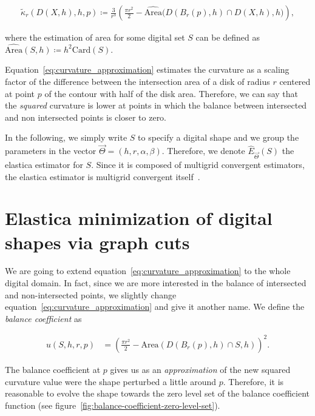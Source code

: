 \documentclass[smallextended]{svjour3}
\begin{document}
\begin{align}
  \tilde{\kappa}_r(D(X,h),h,p) \coloneqq \frac{3}{r^3}\left( \frac{\pi r^2}{2} - \widehat{\text{Area}}\big( D(B_r(p),h) \cap D(X,h),h\big) \right),
  \label{eq:curvature_approximation}
\end{align}

where the estimation of area for some digital set $S$ can be defined as $\widehat{\text{Area}}(S,h) \coloneqq h^2\text{Card}\left( S \right).$ 

Equation~\ref{eq:curvature_approximation} estimates the curvature as a scaling factor of the difference between the intersection area of a disk of radius $r$ centered at point $p$ of the contour with half of the disk area. Therefore, we can say that the \emph{squared} curvature is lower at points in which the balance between intersected and non intersected points is closer to zero.

In the following, we simply write $S$ to specify a digital shape and we group the parameters in the vector $\vec{\Theta}=(h,r,\alpha,\beta)$. Therefore, we denote $\hat{E}_{\vec{\Theta}}(S)$ the elastica estimator for $S$. Since it is composed of multigrid convergent estimators, the elastica estimator is multigrid convergent itself~\cite{lachaud06hdr}.


\section{Elastica minimization of digital shapes via graph cuts}

We are going to extend equation~\ref{eq:curvature_approximation} to the whole digital domain. In fact, since we are more interested in the  balance of intersected and non-intersected points, we slightly change equation~\ref{eq:curvature_approximation} and give it another name. We define the \emph{balance coefficient} as

\begin{align*}
	u(S,h,r,p) &= \left( \frac{\pi r^2}{2} - \widehat{\text{Area}}(D(B_r(p),h) \cap S,h) \right)^2.
\end{align*}

 The balance coefficient at $p$ gives us as an \emph{approximation} of the new squared curvature value were the shape perturbed a little around $p$. Therefore, it is reasonable to evolve the shape towards the zero level set of the balance coefficient function (see figure~\ref{fig:balance-coefficient-zero-level-set}).
 
\end{document}

